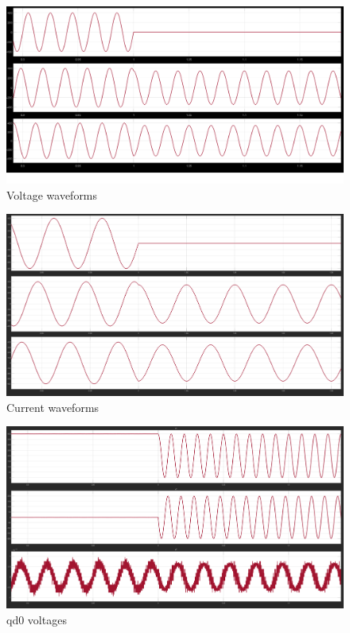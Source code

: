 \documentclass{article}
\begin{document}
\begin{figure}[h!]
\centering
\includegraphics[scale=0.3]{Figures/ResistiveLoad/Vabc.png}
\caption{Voltage waveforms }
\label{fig:ResistiveLoad_Vabc}
\end{figure}

\begin{figure}[h!]
\centering
\includegraphics[scale=0.3]{Figures/ResistiveLoad/Iabc.png}
\caption{Current waveforms}
\label{fig:ResistiveLoad_Iabc}
\end{figure}

\begin{figure}[h!]
\centering
\includegraphics[scale=0.3]{Figures/ResistiveLoad/Vqd0.png}
\caption{qd0 voltages}
\label{fig:ResistiveLoad_Vqd0}
\end{figure}
\end{document}
